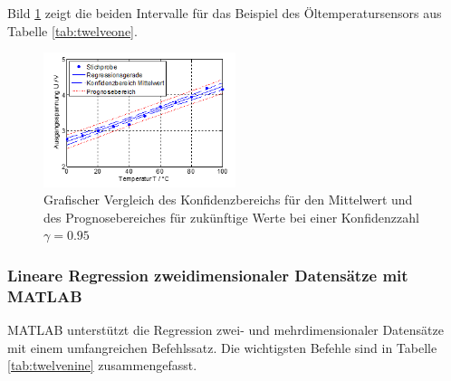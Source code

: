 \noindent Bild \ref{fig:RegressionLinearOeltemperatur6} zeigt die beiden Intervalle f\"{u}r das Beispiel des \"{O}ltemperatursensors aus Tabelle \ref{tab:twelveone}.

\noindent 
\begin{figure}[H]
  \centerline{\includegraphics[width=0.5\textwidth]{Kapitel12/Bilder/image9}}
  \caption{Grafischer Vergleich des Konfidenzbereichs für den Mittelwert und des Prognosebereiches für zukünftige Werte bei einer Konfidenzzahl $\gamma = 0.95$}
  \label{fig:RegressionLinearOeltemperatur6}
\end{figure}

\subsubsection{Lineare Regression zweidimensionaler Datens\"{a}tze mit MATLAB}

\noindent MATLAB unterst\"{u}tzt die Regression zwei- und mehrdimensionaler Datens\"{a}tze mit einem umfangreichen Befehlssatz. Die wichtigsten Befehle sind in Tabelle \ref{tab:twelvenine} zusammengefasst.

\clearpage

